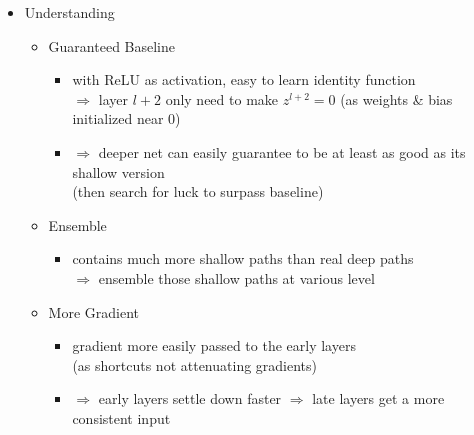 \begin{itemize}
\item Understanding
	\begin{itemize}
	\item Guaranteed Baseline
		\begin{itemize}
		\item with ReLU as activation, easy to learn identity function \\ 
		$\Rightarrow$ layer $l+2$ only need to make $z^{l+2}=0$ (as weights \& bias initialized near $0$)
		\item $\Rightarrow$ deeper net can easily guarantee to be at least as good as its shallow version \\
		(then search for luck to surpass baseline)
		\end{itemize}
	\item Ensemble
		\begin{itemize}
		\item contains much more shallow paths than real deep paths \\
		$\Rightarrow$ ensemble those shallow paths at various level
		\end{itemize}
	\item More Gradient
		\begin{itemize}
		\item gradient more easily passed to the early layers \\ 
		(as shortcuts not attenuating gradients)
		\item $\Rightarrow$ early layers settle down faster $\Rightarrow$ late layers get a more consistent input
		\end{itemize}
	\end{itemize}
\end{itemize}

